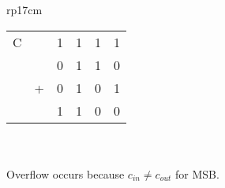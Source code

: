 \documentclass{article}
\begin{document}
\begin{longtable}[l]{rp{17cm}}
\begin{minipage}[t]{\linewidth}
\begin{tabular}{cccccc}
  C &   & 1 & 1 & 1 & 1 \\
    &   & 0 & 1 & 1 & 0 \\
    & + & 0 & 1 & 0 & 1 \\
  \hline
    &   & 1 & 1 & 0 & 0 \\
\end{tabular} \\
\\
Overflow occurs because $c_{in} \neq c_{out}$ for MSB.\\
\end{minipage}\\
\medskip
\end{longtable}
\end{document}
